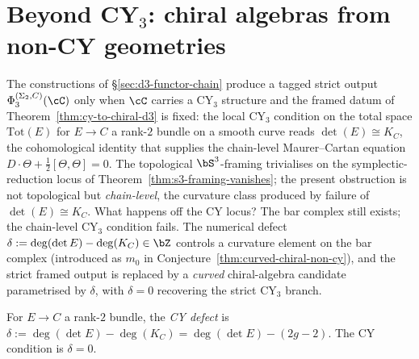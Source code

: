 \section{Beyond CY\texorpdfstring{$_3$}{-3}: chiral algebras from non-CY geometries}
\label{sec:beyond-cy3}

The constructions of \S\ref{sec:d3-functor-chain} produce a tagged strict output $\Phi_3^{(\Sigma_2,C)}(\cC)$ only when $\cC$ carries a CY$_3$ structure and the framed datum of Theorem~\ref{thm:cy-to-chiral-d3} is fixed: the local CY$_3$ condition on the total space $\mathrm{Tot}(E)$ for $E \to C$ a rank-$2$ bundle on a smooth curve reads $\det(E) \cong K_C$, the cohomological identity that supplies the chain-level Maurer--Cartan equation $D \cdot \Theta + \tfrac12 [\Theta, \Theta] = 0$. The topological $\bS^3$-framing trivialises on the symplectic-reduction locus of Theorem~\ref{thm:s3-framing-vanishes}; the present obstruction is not topological but \emph{chain-level}, the curvature class produced by failure of $\det(E) \cong K_C$. What happens off the CY locus? The bar complex still exists; the chain-level CY$_3$ condition fails. The numerical defect $\delta := \deg(\det E) - \deg(K_C) \in \bZ$ controls a curvature element on the bar complex (introduced as $m_0$ in Conjecture~\ref{thm:curved-chiral-non-cy}), and the strict framed output is replaced by a \emph{curved} chiral-algebra candidate parametrised by $\delta$, with $\delta = 0$ recovering the strict CY$_3$ branch.

\begin{definition}[CY defect]
\label{def:cy-defect}
For $E \to C$ a rank-$2$ bundle, the \emph{CY defect} is $\delta := \deg(\det E) - \deg(K_C) = \deg(\det E) - (2g - 2)$. The CY condition is $\delta = 0$.
\end{definition}

